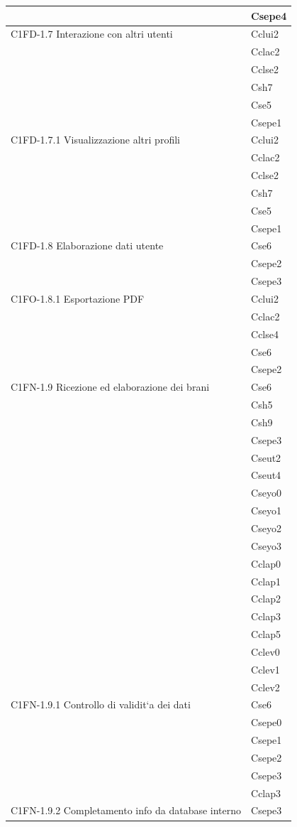 \begin{footnotesize}
\begin{longtable}[!h]{|l|l|}
& Csepe4\\\hline  
C1FD-1.7 Interazione con altri utenti & Cclui2\\
& Cclac2\\
& Cclse2\\
& Csh7\\
& Cse5\\
& Csepe1\\\hline     
C1FD-1.7.1 Visualizzazione altri profili & Cclui2\\
& Cclac2\\
& Cclse2\\
& Csh7\\
& Cse5\\
& Csepe1\\\hline  
C1FD-1.8 Elaborazione dati utente & Cse6\\
& Csepe2\\
& Csepe3\\\hline   
C1FO-1.8.1 Esportazione PDF & Cclui2\\
& Cclac2\\
& Cclse4\\
& Cse6\\
& Csepe2  \\\hline  
C1FN-1.9 Ricezione ed elaborazione dei brani & Cse6\\
& Csh5\\
& Csh9\\
& Csepe3\\
& Cseut2\\
& Cseut4\\
& Cseyo0\\
& Cseyo1\\
& Cseyo2\\
& Cseyo3\\
& Cclap0\\
& Cclap1\\
& Cclap2\\
& Cclap3\\
& Cclap5\\
& Cclev0\\
& Cclev1\\
& Cclev2\\\hline  
C1FN-1.9.1 Controllo di validit`a dei dati & Cse6\\
& Csepe0\\
& Csepe1\\
& Csepe2\\
& Csepe3\\
& Cclap3\\\hline 
C1FN-1.9.2 Completamento info da database interno & Csepe3 \\\hline   

\end{longtable}
\end{footnotesize}
